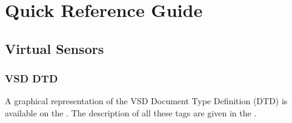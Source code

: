 \graphicspath{{chapters/ch-quickref/figures/}}


\chapter{Quick Reference Guide}

\section{Virtual Sensors}

\subsection{VSD DTD \label{quickref_vsd_dtd}}

A graphical representation of the VSD Document Type Definition (DTD) is available on the . The description of all these tags are given in the
.


